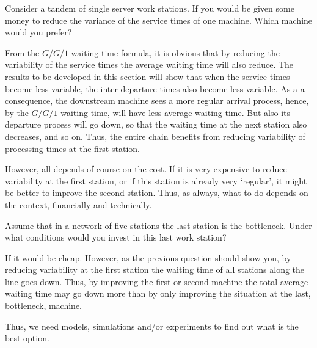\begin{question}
Consider a tandem of single server work stations. If you would be
given some money to reduce the variance of the service times of one
machine.  Which machine would you prefer? 
\begin{solution}
  From the $G/G/1$ waiting time formula, it is obvious that by
  reducing the variability of the service times the average waiting
  time will also reduce.  The results to be developed in this section
  will show that when the service times become less variable, the
  inter departure times also become less variable. As a a consequence,
  the downstream machine sees a more regular arrival process, hence,
  by the $G/G/1$ waiting time, will have less average waiting
  time. But also its departure process will go down, so that the
  waiting time at the next station also decreases, and so on. Thus,
  the entire chain benefits from reducing variability of processing
  times at the first station. 

  However, all depends of course on the cost. If it is very expensive
  to reduce variability at the first station, or if this station is
  already very `regular', it might be better to improve the second
  station. Thus, as always, what to do depends on the context,
  financially and technically.
\end{solution}
\end{question}


\begin{question}
  Assume that in a network of five stations the last station is the
  bottleneck. Under what conditions would you invest in this last
  work station?
  \begin{solution}
    If it would be cheap. However, as the previous question should
    show you, by reducing variability at the first station the waiting
    time of all stations along the line goes down. Thus, by improving
    the first or second machine the total average waiting time may go
    down more than by only improving the situation at the last,
    bottleneck, machine. 

    Thus, we need models, simulations and/or experiments to find out
    what is the best option.
  \end{solution}
\end{question}



